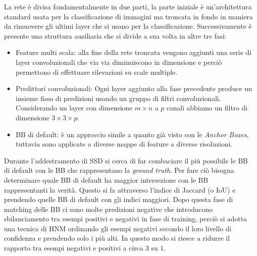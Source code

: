 La rete è divisa fondamentalmente in due parti, la parte iniziale è un'architettura standard usata per la classificazione di immagini ma troncata in fondo in maniera da rimuovere gli ultimi layer che si usano per la classificazione. Successivamente è presente una struttura ausiliaria che si divide a sua volta in altre tre fasi:
\begin{itemize}
    \item Feature multi scala: alla fine della rete troncata vengono aggiunti una serie di layer convoluzionali che via via diminuiscono in dimensione e perciò permettono di effettuare rilevazioni su scale multiple. 
    \item Predittori convoluzionali: Ogni layer aggiunto alla fase precedente produce un insieme fisso di predizioni usando un gruppo di filtri convoluzionali. Considerando un layer con dimensione $m \times n$ a $p$ canali abbiamo un filtro di dimensione $3 \times 3 \times p$.
    \item \ac{BB} di default: è un approccio simile a quanto già visto con le \textit{Anchor Boxes}, tuttavia sono applicate a diverse mappe di feature a diverse risoluzioni. 
\end{itemize}
Durante l'addestramento di \ac{SSD} si cerca di far combaciare il più possibile le \ac{BB} di default con le \ac{BB} che rappresentano la \textit{ground truth}. Per fare ciò bisogna determinare quale \ac{BB} di default ha maggior intersezione con le \ac{BB} rappresentanti la verità. Questo si fa attraverso l'indice di Jaccard (o \ac{IoU}) e prendendo quelle \ac{BB} di default con gli indici maggiori. 
Dopo questa fase di matching delle \ac{BB} ci sono molte predizioni negative che introducono sbilanciamento tra esempi positivi e negativi in fase di training, perciò si adotta una tecnica di \ac{HNM} ordinando gli esempi negativi secondo il loro livello di confidenza e prendendo solo i più alti. In questo modo si riesce a ridurre il rapporto tra esempi negativi e positivi a circa $3$ su $1$.

